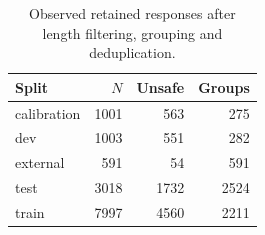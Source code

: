 \begin{table}[t]
\centering\footnotesize
\caption{Observed retained responses after length filtering, grouping and deduplication.}\label{tab:dataset}
\begin{tabular}{lrrr}\toprule
Split & $N$ & Unsafe & Groups \\
\midrule
calibration & 1001 & 563 & 275 \\
dev & 1003 & 551 & 282 \\
external & 591 & 54 & 591 \\
test & 3018 & 1732 & 2524 \\
train & 7997 & 4560 & 2211 \\
\bottomrule\end{tabular}
\end{table}
